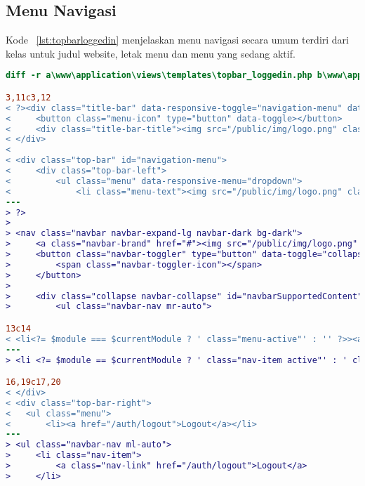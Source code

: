 \subsection{Menu Navigasi}
Kode ~\ref{lst:topbarloggedin} menjelaskan menu navigasi secara umum terdiri dari kelas untuk judul website, letak menu dan menu yang sedang aktif.
\begin{lstlisting}[language=diff, caption=Perubahan file \path{\views\templates\topbar_loggedin.php} ,  basicstyle=\ttfamily, frame=single,
columns=fullflexible, keepspaces=true, breaklines=true, label={lst:topbarloggedin}]
diff -r a\www\application\views\templates\topbar_loggedin.php b\www\application\views\templates\topbar_loggedin.php

3,11c3,12
< ?><div class="title-bar" data-responsive-toggle="navigation-menu" data-hide-for="medium">
<     <button class="menu-icon" type="button" data-toggle></button>
<     <div class="title-bar-title"><img src="/public/img/logo.png" class="textsized" alt="B"/></div>
< </div>
< 
< <div class="top-bar" id="navigation-menu">
<     <div class="top-bar-left">
<         <ul class="menu" data-responsive-menu="dropdown">
<             <li class="menu-text"><img src="/public/img/logo.png" class="textsized" alt="B"/></li>
---
> ?>
> 
> <nav class="navbar navbar-expand-lg navbar-dark bg-dark">
>     <a class="navbar-brand" href="#"><img src="/public/img/logo.png" width="50"/></a>
>     <button class="navbar-toggler" type="button" data-toggle="collapse" data-target="#navbarSupportedContent" aria-controls="navbarSupportedContent" aria-expanded="false" aria-label="Toggle navigation">
>         <span class="navbar-toggler-icon"></span>
>     </button>
> 
>     <div class="collapse navbar-collapse" id="navbarSupportedContent">
>         <ul class="navbar-nav mr-auto">

13c14
< <li<?= $module === $currentModule ? ' class="menu-active"' : '' ?>><a href="/<?= $module ?>"><?= $this->config->item('module-names')[$module] ?></a></li>
---
> <li <?= $module == $currentModule ? ' class="nav-item active"' : ' class="nav-item "' ?>><a class="nav-link" href="/<?= $module ?>"><?= $this->config->item('module-names')[$module] ?></a></li>

16,19c17,20
< </div>
< <div class="top-bar-right">
< 	<ul class="menu">
< 	    <li><a href="/auth/logout">Logout</a></li>
---
> <ul class="navbar-nav ml-auto">
>     <li class="nav-item">
>         <a class="nav-link" href="/auth/logout">Logout</a>
>     </li>
\end{lstlisting}

